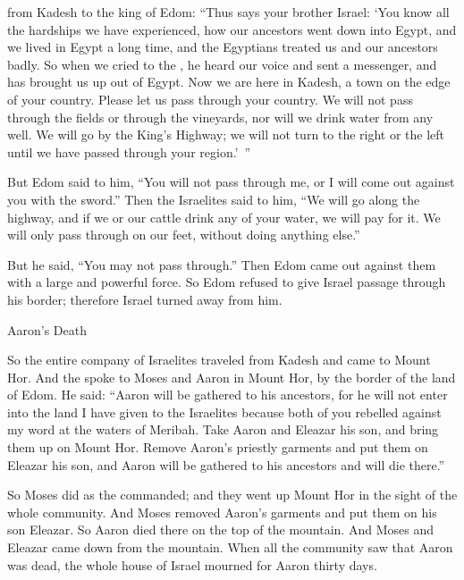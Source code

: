 {from Kadesh
to
the king
of Edom: “Thus
says
your brother
Israel: ‘You
know
all
the hardships we have experienced,
how our ancestors
went down
into Egypt,
and we lived
in Egypt
a long time,
and the Egyptians
treated
us and our ancestors
badly.
So when we cried
to
the {}, he heard
our voice
and sent
a messenger,
and has brought us up out
of Egypt.
Now
we
are here in Kadesh,
a town
on the edge
of your country.
Please
let us pass
through your country.
We will not
pass
through the fields
or through the vineyards,
nor
will we drink
water
from any well.
We will go by
the King’s
Highway; we
will not
turn
to the right
or the left
until
we have
passed
through your region.’ ”
\par }{\PP {}But Edom
said
to him,
“You will not
pass
through me, or
I will come out
against
you with the sword.”
Then the Israelites
said
to
him, “We will go along
the highway,
and if
we
or our cattle
drink
any of your water,
we will pay for it.
We will only
pass through
on our feet,
without doing
anything else.”
\par }{\PP {}But he said,
“You may not
pass
through.” Then
Edom
came out against them
with a large
and powerful force.
So Edom
refused
to give
Israel
passage through
his border;
therefore Israel
turned away from him.
\par }{\SH Aaron’s Death
\par }{\PP {}So the entire
company
of Israelites
traveled
from Kadesh
and came
to Mount
Hor.
And the
{}
spoke
to
Moses
and Aaron
in Mount
Hor,
by the border
of the land
of Edom.
He said:
“Aaron
will be gathered
to
his ancestors,
for
he will not
enter
into
the land
I have
given
to the Israelites
because
both of you rebelled
against my word
at the waters
of Meribah.
Take
Aaron
and Eleazar
his son,
and bring them up
on Mount
Hor.
Remove
Aaron’s
priestly garments
and put
them on
Eleazar
his son,
and Aaron
will be gathered
to his ancestors and will die
there.”
\par }{\PP {}So Moses
did
as
the {}
commanded;
and they went up
Mount
Hor
in the sight
of the whole
community.
And Moses
removed
Aaron’s
garments
and put
them on
his son
Eleazar.
So Aaron
died
there
on the top
of the mountain.
And Moses
and Eleazar
came down
from
the mountain.
When all
the community
saw
that
Aaron
was dead,
the whole
house
of Israel
mourned
for Aaron
thirty
days.


}
